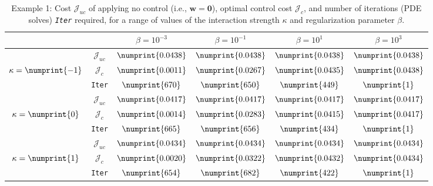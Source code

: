 \begin{table}
\begin{tabular}{ | c | c || c | c | c | c ||}
\hline
\multicolumn{2}{|c||}{}& $\beta = 10^{-3}$ & $\beta = 10^{-1}$ & $\beta = 10^{1}$ & $\beta = 10^{3}$  \\
\hline
\hline
 & $\mathcal{J}_{uc}$ & $\numprint{0.0438}$ & $\numprint{0.0438}$ & $\numprint{0.0438}$ & $\numprint{0.0438}$ \\
$\kappa= \numprint{-1}$  & $\mathcal{J}_c$ & $\numprint{0.0011}$ & $\numprint{0.0267}$ & $\numprint{0.0435}$ & $\numprint{0.0438}$ \\
& \texttt{Iter} & $\numprint{670}$ & $\numprint{650}$ & $\numprint{449}$ & $\numprint{1}$ \\
\hline
 & $\mathcal{J}_{uc}$ & $\numprint{0.0417}$ & $\numprint{0.0417}$ & $\numprint{0.0417}$ & $\numprint{0.0417}$ \\
$\kappa= \numprint{0}$  & $\mathcal{J}_c$ & $\numprint{0.0014}$ & $\numprint{0.0283}$ & $\numprint{0.0415}$ & $\numprint{0.0417}$ \\
& \texttt{Iter} & $\numprint{665}$ & $\numprint{656}$ & $\numprint{434}$ & $\numprint{1}$ \\
\hline
 & $\mathcal{J}_{uc}$ & $\numprint{0.0434}$ & $\numprint{0.0434}$ & $\numprint{0.0434}$ & $\numprint{0.0434}$ \\
$\kappa= \numprint{1}$  & $\mathcal{J}_c$ & $\numprint{0.0020}$ & $\numprint{0.0322}$ & $\numprint{0.0432}$ & $\numprint{0.0434}$ \\
& \texttt{Iter} & $\numprint{654}$ & $\numprint{682}$ & $\numprint{422}$ & $\numprint{1}$ \\
\hline
\end{tabular}
\caption{Example 1: Cost $\mathcal{J}_{uc}$ of applying no control (i.e., $\mathbf{w} = \mathbf{0}$), optimal control cost $\mathcal{J}_{c}$, and number of iterations (PDE solves) \emph{\texttt{Iter}} required, for a range of values of the interaction strength $\kappa$ and regularization parameter $\beta$.}
\label{TabS5:Prob1}
\end{table}